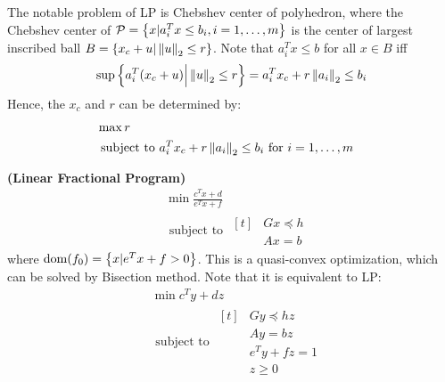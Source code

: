 \begin{remark}
    The notable problem of LP is Chebshev center of polyhedron, where the Chebshev center of $\mathcal{P} = \left\{ x | a^T_i x\le b_i, i=1,\dots,m \right\}$ is the center of largest inscribed ball $B = \left\{ x_c + u | \left\lVert u\right\rVert_2\le r \right\}$. Note that $a_i^Tx\le b$ for all $x\in B$ iff 
    \begin{equation*}
        \sup \Big\{ a^T_i(x_c+u) \Big| \left\lVert u\right\rVert_2\le r \Big\} = a^T_ix_c + r\left\lVert a_i\right\rVert_2\le b_i
    \end{equation*}
    Hence, the $x_c$ and $r$ can be determined by:
    \begin{equation*}
    \begin{aligned}
        &\max r \\
        &\text{ subject to } \begin{aligned}[t]
            &a_i^Tx_c + r\left\lVert a_i\right\rVert_2\le b_i \text{ for } i=1,\dots,m
        \end{aligned}
    \end{aligned}
    \end{equation*}
\end{remark}

\begin{definition}{\textbf{(Linear Fractional Program)}}
    \begin{equation*}
    \begin{aligned}
        &\min \frac{c^Tx+d}{e^Tx+f} \\
        &\text{ subject to } \begin{aligned}[t]
            &Gx\preceq h\\
            &Ax=b
        \end{aligned}
    \end{aligned}
    \end{equation*}
    where $\operatorname{dom}(f_0) = \left\{ x | e^Tx + f > 0 \right\}$. This is a quasi-convex optimization, which can be solved by Bisection method. Note that it is equivalent to LP:
    \begin{equation*}
    \begin{aligned}
        &\min c^Ty + dz \\
        &\text{ subject to } \begin{aligned}[t]
            &Gy\preceq hz\\
            &Ay=bz\\
            &e^Ty+fz=1 \\
            &z\ge0
        \end{aligned}
    \end{aligned}
    \end{equation*}
\end{definition}

